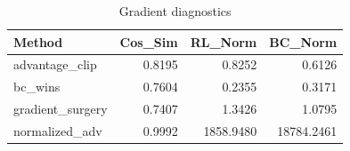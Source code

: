\begin{table}[htbp]
\centering
\caption{Gradient diagnostics}
\label{tab:grad-diag}
\begin{tabular}{lrrr}
\toprule
\textbf{Method} & \textbf{Cos\_Sim} & \textbf{RL\_Norm} & \textbf{BC\_Norm} \\
\midrule
advantage\_clip & 0.8195 & 0.8252 & 0.6126 \\
bc\_wins & 0.7604 & 0.2355 & 0.3171 \\
gradient\_surgery & 0.7407 & 1.3426 & 1.0795 \\
normalized\_adv & 0.9992 & 1858.9480 & 18784.2461 \\
\bottomrule
\end{tabular}
\end{table}